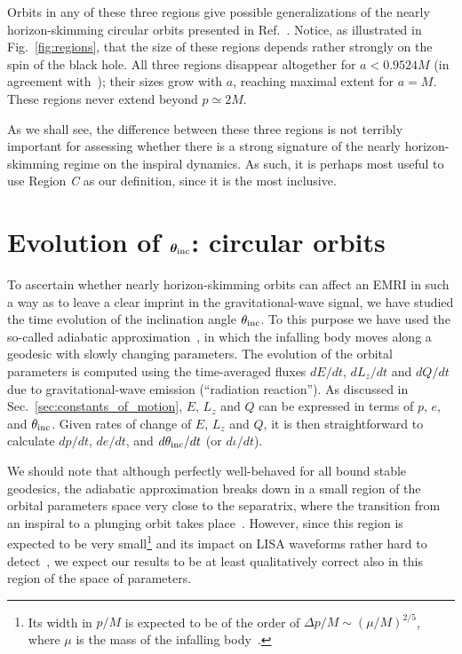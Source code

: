 \documentclass[aps,prd,twocolumn,showpacs,groupedaddress,nofootinbib]{revtex4}
\begin{document}
Orbits in any of these three regions give possible generalizations of
the nearly horizon-skimming circular orbits presented in
Ref.~\cite{skimming}.  Notice, as illustrated in Fig.\
{\ref{fig:regions}}, that the size of these regions depends rather
strongly on the spin of the black hole.  All three regions disappear
altogether for $a < 0.9524M$ (in agreement with~\cite{skimming});
their sizes grow with $a$, reaching maximal extent for $a=M$.  These
regions never extend beyond $p \simeq 2M$.

As we shall see, the difference between these three regions is not
terribly important for assessing whether there is a strong signature
of the nearly horizon-skimming regime on the inspiral dynamics.  As
such, it is perhaps most useful to use Region \textit{C} as our
definition, since it is the most inclusive.

\section{\label{sec:iota_evolution_circular}Evolution of ${\boldsymbol
    \theta_{\rm inc}}$: circular orbits}


To ascertain whether nearly horizon-skimming orbits can affect an EMRI
in such a way as to leave a clear imprint in the gravitational-wave
signal, we have studied the time evolution of the inclination angle
$\theta_{\rm inc}$.  
To this purpose we have used the so-called adiabatic 
approximation~\cite{Mino_adiabatic}, in which the infalling body moves
along a geodesic with slowly changing parameters. The evolution of
the orbital parameters is computed using the time-averaged fluxes
$dE/dt$, $d{L}_z/dt$ and $dQ/dt$ due to gravitational-wave emission
(``radiation reaction''). As discussed in Sec.\
\ref{sec:constants_of_motion}, $E$, $L_z$ and $Q$ can be expressed in
terms of $p$, $e$, and $\theta_{\rm inc}$.  Given rates of change of
$E$, $L_z$ and $Q$, it is then straightforward
{\cite{kludge_hughes}} to calculate $dp/dt$, $de/dt$, and
$d\theta_{\rm inc}/dt$ (or $d\iota/dt$).

We should note that although perfectly well-behaved for all bound stable geodesics, 
the adiabatic approximation breaks down in a small region of the orbital parameters space 
very close to the separatrix, where the transition from an inspiral
to a plunging orbit takes place~\cite{Thorne_Ori}. However, since this
region is expected to be very small\footnote{Its width in $p/M$ is expected 
to be of the order of $\Delta p/M\sim (\mu/M)^{2/5}$, where $\mu$ is the mass of the infalling body~\cite{Thorne_Ori}.} 
and its impact on LISA waveforms rather hard 
to detect~\cite{Thorne_Ori}, we expect our results to be at least qualitatively
correct also in this region of the space of parameters.  
\end{document}
